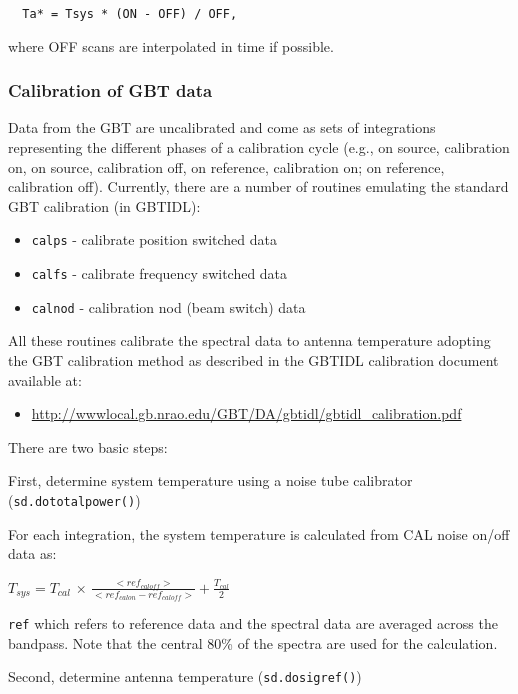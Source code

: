 \begin{verbatim}
  Ta* = Tsys * (ON - OFF) / OFF,
\end{verbatim}

where OFF scans are interpolated in time if possible.


\subsubsection{Calibration of GBT data}
\label{subsubsection:sd.asap.calib.gbt}

Data from the GBT are uncalibrated and come as sets of integrations
representing the different phases of a calibration cycle (e.g., on
source, calibration on, on source, calibration off, on reference,
calibration on; on reference, calibration off). Currently, there are a
number of routines emulating the standard GBT calibration (in GBTIDL):
\begin{itemize}
   \item {\tt calps} - calibrate position switched data
   \item {\tt calfs} - calibrate frequency switched data
   \item {\tt calnod} - calibration nod (beam switch) data
\end{itemize}

All these routines calibrate the spectral data to antenna temperature
adopting the GBT calibration method as described in the
GBTIDL calibration document available at: 
\begin{itemize}
   \item \url{http://wwwlocal.gb.nrao.edu/GBT/DA/gbtidl/gbtidl_calibration.pdf}
\end{itemize}
There are two basic steps:

First, determine system temperature using a noise tube calibrator
({\tt sd.dototalpower()}) 

For each integration, the system temperature is calculated from
CAL noise on/off data as:

$ T_{sys} = T_{cal}$ $\times$ 
$\frac{<ref_{caloff}>}{<ref_{calon} - ref_{caloff}>} + \frac{T_{cal}}{2} $

{\tt ref} which refers to reference data and the spectral data are averaged
across the bandpass.  Note that the central 80\% of the spectra are
used for the calculation.

Second, determine antenna temperature ({\tt sd.dosigref()})

